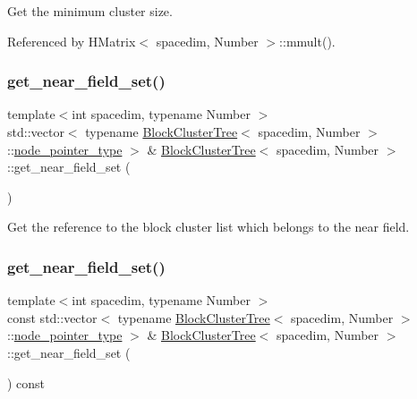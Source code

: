 Get the minimum cluster size. 

Referenced by H\+Matrix$<$ spacedim, Number $>$\+::mmult().

\mbox{\label{classBlockClusterTree_a82f61b31f1e9cf869831fa4c8232df81}} 
\subsubsection{\texorpdfstring{get\+\_\+near\+\_\+field\+\_\+set()}{get\_near\_field\_set()}\hspace{0.1cm}{\footnotesize\ttfamily [1/2]}}
{\footnotesize\ttfamily template$<$int spacedim, typename Number $>$ \\
std\+::vector$<$ typename \hyperlink{classBlockClusterTree}{Block\+Cluster\+Tree}$<$ spacedim, Number $>$\+::\hyperlink{classTreeNode}{node\+\_\+pointer\+\_\+type} $>$ \& \hyperlink{classBlockClusterTree}{Block\+Cluster\+Tree}$<$ spacedim, Number $>$\+::get\+\_\+near\+\_\+field\+\_\+set (\begin{DoxyParamCaption}{ }\end{DoxyParamCaption})}

Get the reference to the block cluster list which belongs to the near field. \mbox{\label{classBlockClusterTree_a6ac71437177d14012c12f7b4f354cdd1}} 
\subsubsection{\texorpdfstring{get\+\_\+near\+\_\+field\+\_\+set()}{get\_near\_field\_set()}\hspace{0.1cm}{\footnotesize\ttfamily [2/2]}}
{\footnotesize\ttfamily template$<$int spacedim, typename Number $>$ \\
const std\+::vector$<$ typename \hyperlink{classBlockClusterTree}{Block\+Cluster\+Tree}$<$ spacedim, Number $>$\+::\hyperlink{classTreeNode}{node\+\_\+pointer\+\_\+type} $>$ \& \hyperlink{classBlockClusterTree}{Block\+Cluster\+Tree}$<$ spacedim, Number $>$\+::get\+\_\+near\+\_\+field\+\_\+set (\begin{DoxyParamCaption}{ }\end{DoxyParamCaption}) const}

